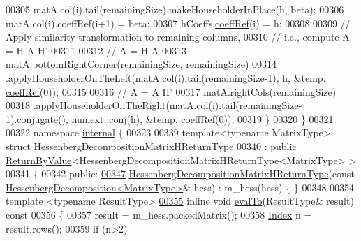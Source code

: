 \begin{DoxyCode}
00305     matA.col(i).tail(remainingSize).makeHouseholderInPlace(h, beta);
00306     matA.col(i).coeffRef(i+1) = beta;
00307     hCoeffs.\hyperlink{class_eigen_1_1_plain_object_base_a25626a55b26a4323565f79d1b7c48ea8}{coeffRef}(i) = h;
00308 
00309     \textcolor{comment}{// Apply similarity transformation to remaining columns,}
00310     \textcolor{comment}{// i.e., compute A = H A H'}
00311 
00312     \textcolor{comment}{// A = H A}
00313     matA.bottomRightCorner(remainingSize, remainingSize)
00314         .applyHouseholderOnTheLeft(matA.col(i).tail(remainingSize-1), h, &temp.
      \hyperlink{class_eigen_1_1_plain_object_base_a25626a55b26a4323565f79d1b7c48ea8}{coeffRef}(0));
00315 
00316     \textcolor{comment}{// A = A H'}
00317     matA.rightCols(remainingSize)
00318         .applyHouseholderOnTheRight(matA.col(i).tail(remainingSize-1).conjugate(), numext::conj(h), &temp.
      \hyperlink{class_eigen_1_1_plain_object_base_a25626a55b26a4323565f79d1b7c48ea8}{coeffRef}(0));
00319   \}
00320 \}
00321 
00322 \textcolor{keyword}{namespace }\hyperlink{namespaceinternal}{internal} \{
00323 
00339 \textcolor{keyword}{template}<\textcolor{keyword}{typename} MatrixType> \textcolor{keyword}{struct }HessenbergDecompositionMatrixHReturnType
00340 : \textcolor{keyword}{public} \hyperlink{group___core___module_class_eigen_1_1_return_by_value}{ReturnByValue}<HessenbergDecompositionMatrixHReturnType<MatrixType> >
00341 \{
00342   \textcolor{keyword}{public}:
\hyperlink{group___eigenvalues___module_aa6d46d84c1343c964c50457ca4ddf9fa}{00347}     \hyperlink{group___eigenvalues___module_aa6d46d84c1343c964c50457ca4ddf9fa}{HessenbergDecompositionMatrixHReturnType}(\textcolor{keyword}{const} 
      \hyperlink{group___eigenvalues___module}{HessenbergDecomposition<MatrixType>}& hess) : m\_hess(hess) \{ \}
00348 
00354     \textcolor{keyword}{template} <\textcolor{keyword}{typename} ResultType>
\hyperlink{group___eigenvalues___module_a7f1d84113072d2d2e507d3821ff9f15c}{00355}     \textcolor{keyword}{inline} \textcolor{keywordtype}{void} \hyperlink{group___eigenvalues___module_a7f1d84113072d2d2e507d3821ff9f15c}{evalTo}(ResultType& result)\textcolor{keyword}{ const}
00356 \textcolor{keyword}{    }\{
00357       result = m\_hess.packedMatrix();
00358       \hyperlink{namespace_eigen_a62e77e0933482dafde8fe197d9a2cfde}{Index} n = result.rows();
00359       \textcolor{keywordflow}{if} (n>2)

\end{DoxyCode}
